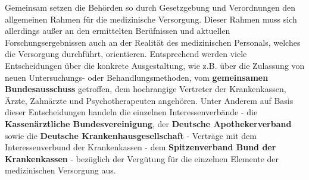 Gemeinsam setzen die Behörden so durch Gesetzgebung und Verordnungen den allgemeinen Rahmen für die medizinische Versorgung. Dieser Rahmen muss sich allerdings außer an den ermittelten Berüfnissen und aktuellen Forschungsergebnissen auch an der Realität des medizinischen Personals, welches die Versorgung durchführt, orientieren. Entsprechend werden viele Entscheidungen über die konkrete Ausgestaltung, wie z.B. über die Zulassung von neuen Untersuchungs- oder Behandlungsmethoden, vom \textbf{gemeinsamen Bundesausschuss} getroffen, dem hochrangige Vertreter der Krankenkassen, Ärzte, Zahnärzte und Psychotherapeuten angehören. Unter Anderem auf Basis dieser Entscheidungen handeln die einzelnen Interessenverbände - die \textbf{Kassenärztliche Bundesvereinigung}, der \textbf{Deutsche Apothekerverband} sowie die \textbf{Deutsche Krankenhausgesellschaft} - Verträge mit dem Interessenverbund der Krankenkassen - dem \textbf{Spitzenverband Bund der Krankenkassen} - bezüglich der Vergütung für die einzelnen Elemente der medizinischen Versorgung aus. 



